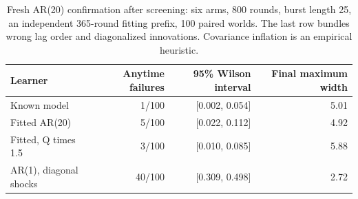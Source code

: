 \begin{table}[!htbp]\centering\small
\begin{lrbox}{\latestTableBox}
\begin{tabular}{lrrr}
\toprule
Learner & Anytime failures & 95\% Wilson interval & Final maximum width \\
\midrule
Known model & 1/100 & [0.002, 0.054] & 5.01 \\
Fitted AR(20) & 5/100 & [0.022, 0.112] & 4.92 \\
Fitted, Q times 1.5 & 3/100 & [0.010, 0.085] & 5.88 \\
AR(1), diagonal shocks & 40/100 & [0.309, 0.498] & 2.72 \\
\bottomrule
\end{tabular}\end{lrbox}
\ifdim\wd\latestTableBox>\linewidth\resizebox{\linewidth}{!}{\usebox{\latestTableBox}}\else\usebox{\latestTableBox}\fi
\caption{Fresh AR(20) confirmation after screening: six arms, 800 rounds, burst length 25, an independent 365-round fitting prefix, 100 paired worlds. The last row bundles wrong lag order and diagonalized innovations. Covariance inflation is an empirical heuristic.}
\label{tab:latest-coverage}
\end{table}
